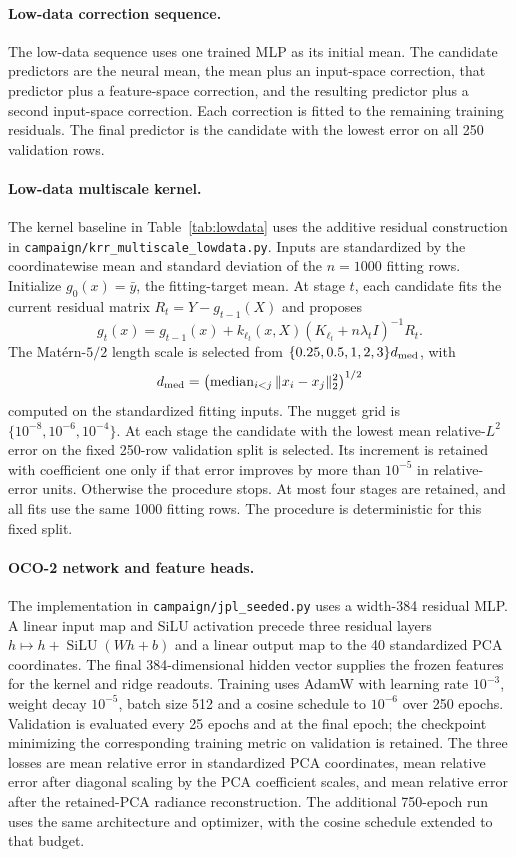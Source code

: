 \paragraph{Low-data correction sequence.}
The low-data sequence uses one trained MLP as its initial mean. The candidate predictors are the neural mean,
the mean plus an input-space correction, that predictor plus a
feature-space correction, and the resulting predictor plus a second
input-space correction. Each correction is fitted to the remaining
training residuals. The final predictor is the candidate with the lowest
error on all 250 validation rows.

\paragraph{Low-data multiscale kernel.}\label{supp:multiscale-lowdata}
The kernel baseline in Table~\ref{tab:lowdata} uses the additive residual
construction in \texttt{campaign/krr\_multiscale\_lowdata.py}. Inputs are
standardized by the coordinatewise mean and standard deviation of the
$n=1000$ fitting rows. Initialize $g_0(x)=\bar y$, the fitting-target mean.
At stage $t$, each candidate fits the current residual matrix
$R_t=Y-g_{t-1}(X)$ and proposes
\[
 g_t(x)=g_{t-1}(x)
   +k_{\ell_t}(x,X)(K_{\ell_t}+n\lambda_t I)^{-1}R_t.
\]
The Mat\'ern-$5/2$ length scale is selected from
$\{0.25,0.5,1,2,3\}d_{\rm med}$, with
\[
d_{\rm med}=\left(\operatorname{median}_{i<j}\|x_i-x_j\|_2^2\right)^{1/2}
\]
computed on the standardized fitting inputs. The nugget grid is
$\{10^{-8},10^{-6},10^{-4}\}$. At each stage the candidate with the lowest
mean relative-$L^2$ error on the fixed 250-row validation split is selected.
Its increment is retained with coefficient one only if that error improves
by more than $10^{-5}$ in relative-error units. Otherwise the procedure
stops. At most four stages are retained, and all fits use the same 1000
fitting rows. The procedure is deterministic for this fixed split.

\paragraph{OCO-2 network and feature heads.}\label{supp:oco-network}
The implementation in \texttt{campaign/jpl\_seeded.py} uses a width-384
residual MLP. A linear input map and SiLU activation precede three
residual layers $h\mapsto h+\operatorname{SiLU}(Wh+b)$ and a linear output
map to the 40 standardized PCA coordinates. The final 384-dimensional
hidden vector supplies the frozen features for the kernel and ridge
readouts. Training uses AdamW with learning rate $10^{-3}$, weight decay
$10^{-5}$, batch size 512 and a cosine schedule to $10^{-6}$ over 250
epochs. Validation is evaluated every 25 epochs and at the final epoch;
the checkpoint minimizing the corresponding training metric on validation
is retained. The three losses are mean relative error in standardized PCA
coordinates, mean relative error after diagonal scaling by the PCA
coefficient scales, and mean relative error after the retained-PCA radiance
reconstruction. The additional 750-epoch run uses the same architecture and
optimizer, with the cosine schedule extended to that budget.

